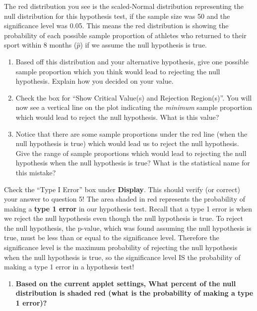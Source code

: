 \documentclass[
]{report}
\providecommand{\tightlist}{%
  \setlength{\itemsep}{0pt}\setlength{\parskip}{0pt}}
\begin{document}
The red distribution you see is the scaled-Normal distribution representing the null distribution for this hypothesis test, if the sample size was 50 and the significance level was 0.05. This means the red distribution is showing the probability of each possible sample proportion of athletes who returned to their sport within 8 months (\(\hat{p}\)) if we assume the null hypothesis is true.

\begin{enumerate}
\def\labelenumi{\arabic{enumi}.}
\setcounter{enumi}{2}
\item
  Based off this distribution and your alternative hypothesis, give one possible sample proportion which you think would lead to rejecting the null hypothesis. Explain how you decided on your value.
  \vspace{0.25in}
\item
  Check the box for ``Show Critical Value(s) and Rejection Region(s)''. You will now see a vertical line on the plot indicating the \emph{minimum} sample proportion which would lead to reject the null hypothesis. What is this value?\\
  \vspace{0.25in}
\item
  Notice that there are some sample proportions under the red line (when the null hypothesis is true) which would lead us to reject the null hypothesis. Give the range of sample proportions which would lead to rejecting the null hypothesis when the null hypothesis is true? What is the statistical name for this mistake?
  \vspace{0.4in}
\end{enumerate}

Check the ``Type I Error'' box under \textbf{Display}. This should verify (or correct) your answer to question 5! The area shaded in red represents the probability of making a \textbf{type 1 error} in our hypothesis test. Recall that a type 1 error is when we reject the null hypothesis even though the null hypothesis is true. To reject the null hypothesis, the p-value, which was found assuming the null hypothesis is true, must be less than or equal to the significance level. Therefore the significance level is the maximum probability of rejecting the null hypothesis when the null hypothesis is true, so the significance level IS the probability of making a type 1 error in a hypothesis test!

\begin{enumerate}
\def\labelenumi{\arabic{enumi}.}
\setcounter{enumi}{5}
\tightlist
\item
  \textbf{Based on the current applet settings, What percent of the null distribution is shaded red (what is the probability of making a type 1 error)?}
  \vspace{0.25in}
\end{enumerate}
\end{document}

